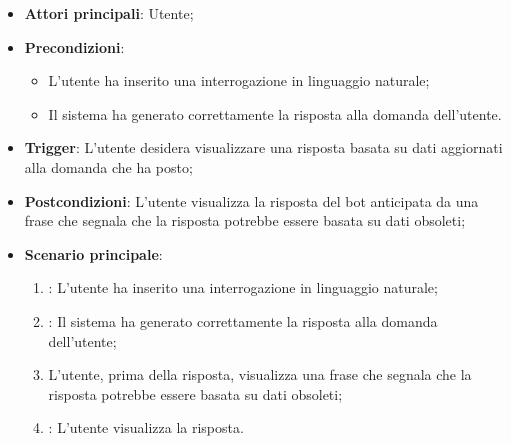\begin{itemize}
    \item \textbf{Attori principali}: Utente;
    \item \textbf{Precondizioni}: 
    \begin{itemize}
        \item L'utente ha inserito una interrogazione in linguaggio naturale;
        \item Il sistema ha generato correttamente la risposta alla domanda dell'utente.
    \end{itemize}
    \item \textbf{Trigger}: L'utente desidera visualizzare una risposta basata su dati aggiornati alla domanda che ha posto;
    \item \textbf{Postcondizioni}: L'utente visualizza la risposta del bot anticipata da una frase che segnala che la
    risposta potrebbe essere basata su dati obsoleti;
    \item \textbf{Scenario principale}: 
    \begin{enumerate}
        \item {}: L'utente ha inserito una interrogazione in linguaggio naturale;
        \item {}: Il sistema ha generato correttamente la risposta alla domanda dell'utente;
        \item L'utente, prima della risposta, visualizza una frase che segnala che la risposta potrebbe essere basata su dati obsoleti;
        \item {}: L'utente visualizza la risposta.
    \end{enumerate}
\end{itemize}